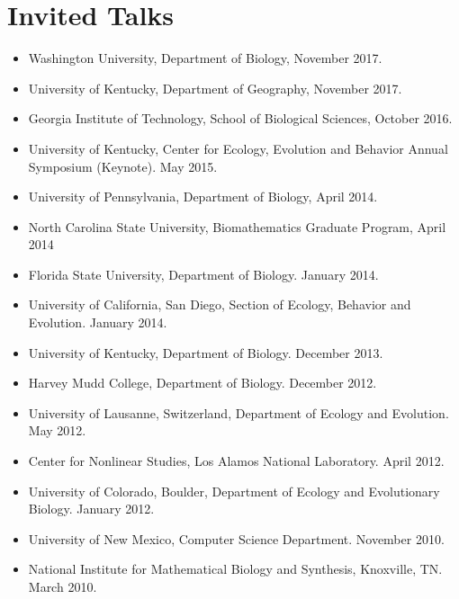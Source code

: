 \documentclass[11pt]{article}
\begin{document}
  \section{Invited Talks}
  \begin{itemize}
  \item Washington University, Department of Biology, November 2017.
  \item University of Kentucky, Department of Geography, November 2017.
  \item Georgia Institute of Technology, School of Biological Sciences, October 2016.
  \item University of Kentucky, Center for Ecology, Evolution and Behavior Annual Symposium (Keynote). May 2015.
  \item University of Pennsylvania, Department of Biology, April 2014.
  \item North Carolina State University, Biomathematics Graduate Program, April 2014
  \item Florida State University, Department of Biology.  January 2014.
  \item University of California, San Diego, Section of Ecology, Behavior and Evolution.  January 2014.
  \item University of Kentucky, Department of Biology. December 2013.
  \item Harvey Mudd College, Department of Biology. December 2012.
  \item %
    University of Lausanne, Switzerland, Department of Ecology and Evolution. May 2012.
  \item %
    Center for Nonlinear Studies, Los Alamos National Laboratory. April 2012.
  \item %
    University of Colorado, Boulder, Department of Ecology and Evolutionary Biology. January 2012.
  \item %
    University of New Mexico, Computer Science Department. November 2010.
  \item %
    National Institute for Mathematical Biology and Synthesis, Knoxville, TN. March 2010.
  \end{itemize}
  
\end{document}
